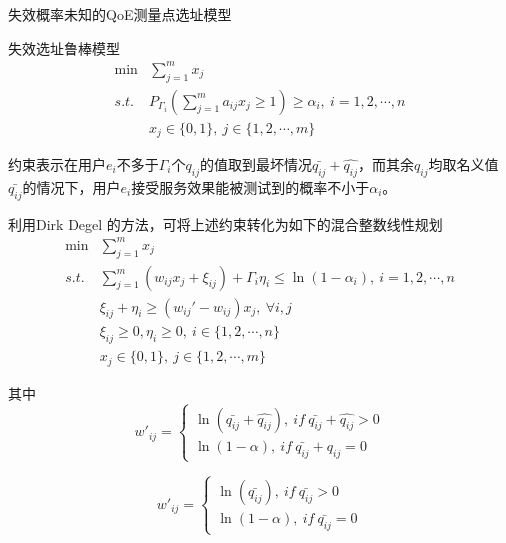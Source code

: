 \documentclass[10pt]{beamer}
\begin{document}
\begin{frame}{失效概率未知的QoE测量点选址模型}
  \begin{block}{失效选址鲁棒模型}
\begin{align*}
    \min & \sum_{j=1}^m x_j\\
    s.t.&P_{\Gamma_i}(\sum_{j=1}^m a_{ij}x_j\geq 1)\geq \alpha_i,\ i=1,2,\cdots,n\\
    &x_j\in\{0,1\},\ j\in \{1,2,\cdots,m\}
  \end{align*}
  \end{block}
约束表示在用户$e_i$不多于$\Gamma_i$个$q_{ij}$的值取到最坏情况$\bar{q_{ij}}+\hat{q_{ij}}$，而其余$q_{ij}$均取名义值$\bar{q_{ij}}$的情况下，用户$e_i$接受服务效果能被测试到的概率不小于$\alpha_i$。

\end{frame}
\begin{frame}
利用Dirk Degel 的方法，可将上述约束转化为如下的混合整数线性规划
\begin{align*}
    \min & \sum_{j=1}^m x_j\\
    s.t.&\sum_{j=1}^m (w_{ij}x_j+\xi_{ij})+\Gamma_i \eta_i \leq \ln(1-\alpha_i),\ i=1,2,\cdots,n\\
    & \xi_{ij}+\eta_i\geq (w_{ij}'-w_{ij})x_j,\ \forall i,j\\
    & \xi_{ij}\geq 0,\eta_i\geq 0,\ i\in\{1,2,\cdots,n\}\\
    &x_j\in\{0,1\},\ j\in \{1,2,\cdots,m\}
  \end{align*}
\end{frame}
\begin{frame}
其中
\begin{equation*}
  w'_{ij}=\begin{cases}
    \ln(\bar{q_{ij}}+\hat{q_{ij}}),\ if \ \bar{q_{ij}}+\hat{q_{ij}}>0\\
    \ln(1-\alpha), \ if\  \bar{q_{ij}}+\hat{q_{ij}}=0
  \end{cases}
\end{equation*}

\begin{equation*}
  w'_{ij}=\begin{cases}
    \ln(\bar{q_{ij}}),\ if \ \bar{q_{ij}}>0\\
    \ln(1-\alpha), \ if\ \bar{q_{ij}}=0
  \end{cases}
\end{equation*}
\end{frame}
\end{document}
